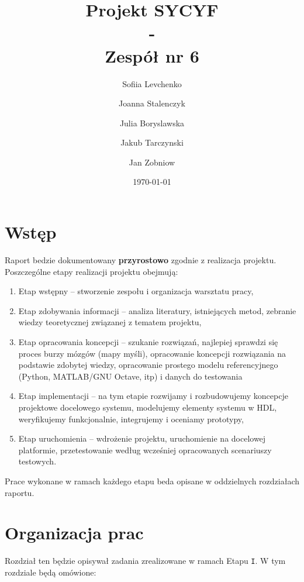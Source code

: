\documentclass[a4paper,titleauthor]{mwart}
\title{{\Huge  Projekt SYCYF}\\ - \\{\Large Zespół nr 6}\\ }
\author{Sofiia Levchenko \and Joanna Stalenczyk \and Julia Boryslawska \and Jakub Tarczynski \and Jan Zobniow}
\date{\today}
\begin{document}
	

\maketitle
\tableofcontents

\section{Wstęp}
\label{sec:wstep}%

Raport bedzie dokumentowany \textbf{przyrostowo} zgodnie z realizacja projektu. Poszczególne etapy realizacji projektu obejmują: 

\renewcommand{\labelenumi}{\Roman{enumi}}
\begin{enumerate}\setlength{\itemsep}{0.2\baselineskip} 
	\item Etap wstępny – stworzenie zespołu i organizacja warsztatu pracy, 
	\item Etap zdobywania informacji – analiza literatury, istniejących metod, zebranie wiedzy teoretycznej związanej z tematem projektu, 
	\item Etap opracowania koncepcji – szukanie rozwiązań, najlepiej sprawdzi się proces burzy mózgów (mapy myśli), opracowanie koncepcji rozwiązania  na podstawie zdobytej wiedzy, opracowanie prostego modelu referencyjnego (Python, MATLAB/GNU Octave, itp) i danych do testowania  
	\item Etap implementacji – na tym etapie rozwijamy i rozbudowujemy koncepcje projektowe docelowego systemu, modelujemy elementy systemu w HDL, weryfikujemy funkcjonalnie, integrujemy i oceniamy prototypy, 
	\item Etap uruchomienia – wdrożenie projektu, uruchomienie na docelowej platformie, przetestowanie według wcześniej opracowanych scenariuszy testowych. 
\end{enumerate}

Prace wykonane w ramach każdego etapu beda opisane w oddzielnych rozdziałach raportu.

\section{Organizacja prac}
\label{sec:organizacja}

Rozdział ten będzie opisywał zadania zrealizowane w ramach Etapu \texttt{I}. W tym rozdziale będą omówione:
\end{document}
